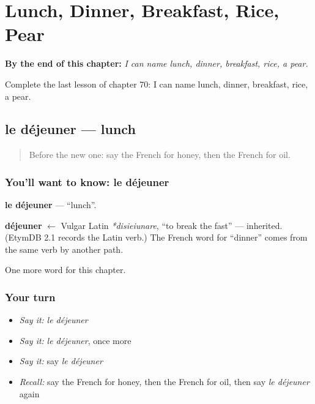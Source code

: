 
\chapter{Lunch, Dinner, Breakfast, Rice, Pear}
\label{ch:fr-lunch-dinner-breakfast-rice-pear}

\begin{chapteropening}
\textbf{By the end of this chapter:} \emph{I can name lunch, dinner, breakfast, rice, a pear.}

Complete the last lesson of chapter 70: I can name lunch, dinner, breakfast, rice, a pear.
\end{chapteropening}

\section[le déjeuner]{le déjeuner — lunch}

\label{lesson:FR-C70-dejeuner}



\begin{quote}
Before the new one: say the French for honey, then the French for oil.
\end{quote}

\subsection*{You'll want to know: le déjeuner}
\textbf{le déjeuner} — \textquotedblleft{}lunch\textquotedblright{}.

\begin{cousinweb}
\textbf{déjeuner} $\leftarrow$ Vulgar Latin \emph{*disieiunare}, \textquotedblleft{}to break the fast\textquotedblright{} — inherited. (EtymDB 2.1 records the Latin verb.) The French word for \textquotedblleft{}dinner\textquotedblright{} comes from the same verb by another path.
\end{cousinweb}

\begin{grammarlens}[title={What you've built}]
One more word for this chapter.
\end{grammarlens}

\subsection*{Your turn}
\begin{itemize}
\raggedright
  \item \emph{Say it:} \emph{le déjeuner}
  \item \emph{Say it:} \emph{le déjeuner}, once more
  \item \emph{Say it:} say \emph{le déjeuner}
  \item \emph{Recall:} say the French for honey, then the French for oil, then say \emph{le déjeuner} again
\end{itemize}

